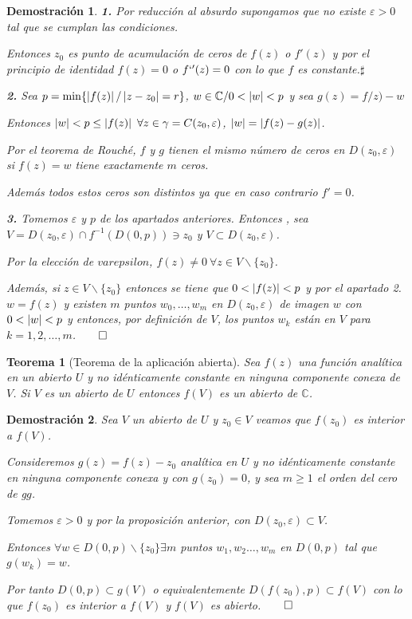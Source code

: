 \documentclass[10pt]{book}
\newtheorem{theorem}{Teorema}[chapter]
\newtheorem*{dem}{Demostración}
\newcommand{\C}{\mathbb{C}}
\begin{document}
\begin{dem}
\textbf{1.} Por reducción al absurdo supongamos que no existe $\varepsilon>0$ tal que se cumplan las condiciones.

Entonces $z_0$ es punto de acumulación de ceros de $f(z)$ o $f'(z)$ y por el principio de identidad $f(z)=0$ o $f`'(z)=0$ con lo que $f$ es constante.$\sharp$

\textbf{2.} Sea $p = \min\{\left| f(z)\right|/ \left| z-z_0\right|=r\}$, $w\in \C / 0<\abs{w}<p$ y sea $g(z) = f/z)-w$

Entonces $\abs{w} <p\leq \abs{f(z)}\ \forall z\in \gamma = C(z_0,\varepsilon)$, $\left| w\right| = \left| f(z)-g(z)\right|$.

Por el teorema de Rouché, $f$ y $g$ tienen el mismo número de ceros en $D(z_0,\varepsilon)$ si $f(z) = w$ tiene exactamente $m$ ceros.

Además todos estos ceros son distintos ya que en caso contrario $f'=0$.

\textbf{3.} Tomemos $\varepsilon$ y $p$ de los apartados anteriores.  Entonces , sea $V = D(z_0,\varepsilon)\cap f^{-1}(D(0,p))\ni z_0$ y $V\subset  D(z_0,\varepsilon)$.

Por la elección de $varepsilon$, $f(z) \neq 0\ \forall z\in V\backslash\{z_0\}$.

Además, si $z\in V\backslash\{z_0\}$ entonces se tiene que $0<\left| f(z)\right|<p$ y por el apartado 2. $w=f(z)$ y existen $m$ puntos $w_0,\ldots,w_m$ en $D(z_0,\varepsilon)$ de imagen $w$ con $0<\left| w\right|<p$ y entonces, por definición de $V$, los puntos $w_k$ están en $V$ para $k = 1,2,\ldots,m$.$\qed$
\end{dem}


\begin{theorem}[Teorema de la aplicación abierta]
Sea $f(z)$ una función analítica en un abierto $U$ y no idénticamente constante en ninguna componente conexa de $V$. Si $V$ es un abierto de $U$ entonces $f(V)$ es un abierto de $\C$.
\end{theorem}

\begin{dem}
Sea $V$ un abierto de $U$ y $z_0\in V$ veamos que $f(z_0)$ es interior a $f(V)$. 

Consideremos $g(z) = f(z) -z_0$ analítica en $U$ y no idénticamente constante en ninguna componente conexa y con $g(z_0) = 0$, y sea $m\geq 1$  el orden del cero de g$g$.

Tomemos $\varepsilon >0$ y por la proposición anterior, con $D(z_0,\varepsilon )\subset V$.

Entonces $\forall w \in D(0,p)\backslash \{z_0\} \exists m$ puntos  $w_1,w_2\ldots,w_m$ en $D(0,p)$ tal que $g(w_k)=w$.

Por tanto $D(0,p)\subset g(V)$ o equivalentemente $D(f(z_0),p) \subset f(V)$ con lo que $f(z_0)$ es interior a $f(V)$ y $f(V)$ es abierto.$\qed$
\end{dem}
\end{document}
